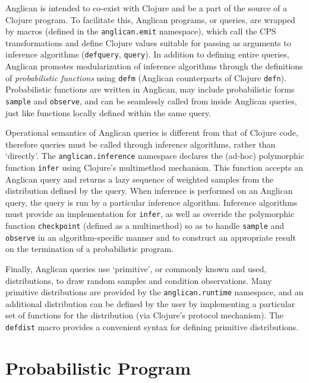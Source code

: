 \documentclass[preprint]{sigplanconf}
\begin{document}
Anglican is intended to co-exist with Clojure and be a part of
the source of a Clojure program. To facilitate this, Anglican
programs, or queries, are wrapped by macros (defined in the
\texttt{anglican.emit} namespace), which call the CPS
transformations and define Clojure values suitable for passing
as arguments to inference algorithms (\texttt{defquery},
\texttt{query}). In addition to defining entire queries,
Anglican promotes modularization of inference algorithms through
the definitions of \textit{probabilistic functions} using
\texttt{defm}
(Anglican counterparts of Clojure \texttt{defn}).
Probabilistic functions are
written in Anglican, may include probabilistic forms
\texttt{sample} and \texttt{observe}, and can be seamlessly
called from inside Anglican queries, just like functions locally
defined within the same query.

Operational semantics of Anglican queries is different from that
of Clojure code, therefore queries must be called through
inference algorithms, rather than `directly'.  The
\texttt{anglican.inference} namespace declares the (ad-hoc) polymorphic
function \texttt{infer} using Clojure's multimethod mechanism.
This function accepts an Anglican query and
returns a lazy sequence of weighted samples from the
distribution defined by the query.  When inference
is performed on an Anglican query, the query is run by a
particular inference algorithm. Inference algorithms must
provide an implementation for \texttt{infer}, as well as
override the polymorphic function \texttt{checkpoint} (defined
as a multimethod) so as to handle \texttt{sample} and
\texttt{observe} in an algorithm-specific manner and
to construct an appropriate result on the
termination of a probabilistic program.

Finally, Anglican queries use `primitive', or commonly known
and used, distributions, to draw random samples and condition
observations. Many primitive distributions are provided by the
\texttt{anglican.runtime} namespace, and an additional
distribution can be defined by the user by implementing a
particular set of functions for the distribution
(via Clojure's protocol mechanism). The \texttt{defdist} macro
provides a convenient syntax for defining primitive distributions.

\section{Probabilistic Program}
\label{sec:pp-def}
\end{document}
